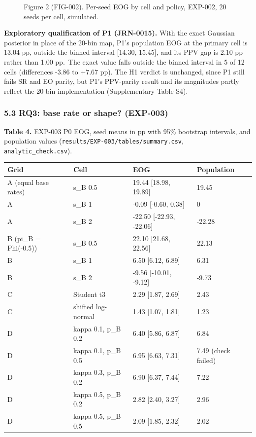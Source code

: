 \documentclass[
]{article}
\makeatletter
\newcommand*\pandocbounded[1]{%
  \sbox\pandoc@box{#1}%
  \Gscale@div\@tempa{\textheight}{\dimexpr\ht\pandoc@box+\dp\pandoc@box\relax}%
  \Gscale@div\@tempb{\linewidth}{\wd\pandoc@box}%
  \ifdim\@tempb\p@<\@tempa\p@\let\@tempa\@tempb\fi%
  \ifdim\@tempa\p@<\p@\scalebox{\@tempa}{\usebox\pandoc@box}%
  \else\usebox{\pandoc@box}%
  \fi%
}
\makeatother
\begin{document}
\begin{figure}
\centering
\pandocbounded{}
\caption{Figure 2 (FIG-002). Per-seed EOG by cell and policy, EXP-002,
20 seeds per cell, simulated.}
\end{figure}

\textbf{Exploratory qualification of P1 (JRN-0015).} With the exact
Gaussian posterior in place of the 20-bin map, P1's population EOG at
the primary cell is 13.04 pp, outside the binned interval {[}14.30,
15.45{]}, and its PPV gap is 2.10 pp rather than 1.00 pp.~The exact
value falls outside the binned interval in 5 of 12 cells (differences
-3.86 to +7.67 pp). The H1 verdict is unchanged, since P1 still fails SR
and EO parity, but P1's PPV-parity result and its magnitudes partly
reflect the 20-bin implementation (Supplementary Table S4).

\subsubsection{5.3 RQ3: base rate or shape?
(EXP-003)}\label{rq3-base-rate-or-shape-exp-003}

\textbf{Table 4.} EXP-003 P0 EOG, seed means in pp with 95\% bootstrap
intervals, and population values
(\texttt{results/EXP-003/tables/summary.csv},
\texttt{analytic\_check.csv}).

\begin{longtable}[]{@{}llll@{}}
\toprule\noalign{}
Grid & Cell & EOG & Population \\
\midrule\noalign{}
\endhead
\bottomrule\noalign{}
\endlastfoot
A (equal base rates) & s\_B 0.5 & 19.44 {[}18.98, 19.89{]} & 19.45 \\
A & s\_B 1 & -0.09 {[}-0.60, 0.38{]} & 0 \\
A & s\_B 2 & -22.50 {[}-22.93, -22.06{]} & -22.28 \\
B (pi\_B = Phi(-0.5)) & s\_B 0.5 & 22.10 {[}21.68, 22.56{]} & 22.13 \\
B & s\_B 1 & 6.50 {[}6.12, 6.89{]} & 6.31 \\
B & s\_B 2 & -9.56 {[}-10.01, -9.12{]} & -9.73 \\
C & Student t3 & 2.29 {[}1.87, 2.69{]} & 2.43 \\
C & shifted log-normal & 1.43 {[}1.07, 1.81{]} & 1.23 \\
D & kappa 0.1, p\_B 0.2 & 6.40 {[}5.86, 6.87{]} & 6.84 \\
D & kappa 0.1, p\_B 0.5 & 6.95 {[}6.63, 7.31{]} & 7.49 (check failed) \\
D & kappa 0.3, p\_B 0.2 & 6.90 {[}6.37, 7.44{]} & 7.22 \\
D & kappa 0.5, p\_B 0.2 & 2.82 {[}2.40, 3.27{]} & 2.96 \\
D & kappa 0.5, p\_B 0.5 & 2.09 {[}1.85, 2.32{]} & 2.02 \\
\end{longtable}
\end{document}

